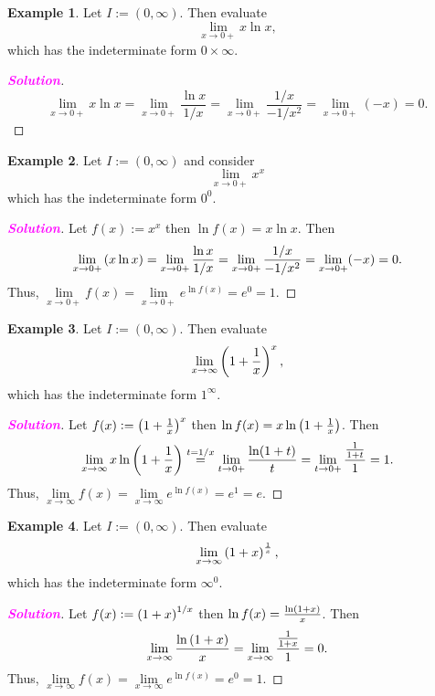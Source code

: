 \documentclass[12pt,openany]{book}
\theoremstyle{definition}
\newtheorem{example}{Example}[chapter]
\newcommand{\sol}{\textcolor{magenta}{\bf Solution}}
\begin{document}
	\begin{example}
		Let $I:=(0,\infty)$. Then evaluate \[
		\lim\limits_{x\to 0+}x\ln x,
		\] which has the indeterminate form $0\times\infty$.
		\begin{proof}[\sol]
			\[
			\lim\limits_{x\to 0+}x\ln x=\lim\limits_{x\to 0+}\frac{\ln x}{1/x}=\lim\limits_{x\to 0+}\frac{1/x}{-1/x^2}=\lim\limits_{x\to 0+}(-x)=0.
			\]
		\end{proof}
	\end{example}
	\vspace{15pt}
	\newpage
	\begin{example}
		Let $I:=(0,\infty)$ and consider \[
		\lim\limits_{x\to 0+}x^x
		\] which has the indeterminate form $0^0$.
		\begin{proof}[\sol]
			Let $f(x):=x^x$ then $\ln f(x)=x\ln x$. Then \[
			\lim\limits_{x\to 0+}\del{x\ln x}=\lim\limits_{x\to 0+}\frac{\ln x}{1/x}=\lim\limits_{x\to 0+}\frac{1/x}{-1/x^2}=\lim\limits_{x\to 0+}(-x)=0.
			\] Thus, $\lim\limits_{x\to 0+}f(x)=\lim\limits_{x\to 0+}e^{\ln f(x)}=e^0=1$.
		\end{proof}
	\end{example}
	\vspace{20pt}
	\begin{example}
		Let $I:=(0,\infty)$. Then evaluate \[
		\lim\limits_{x\to \infty}\del{1+\frac{1}{x}}^x,
		\] which has the indeterminate form $1^\infty$.
		\begin{proof}[\sol]
			Let $f(x):=\del{1+\frac{1}{x}}^x$ then $\ln f(x)=x\ln\del{1+\frac{1}{x}}$. Then \[
			\lim\limits_{x\to\infty}x\ln\del{1+\frac{1}{x}}\overset{t=1/x}{=}\lim\limits_{t\to 0+}\frac{\ln(1+t)}{t}=\lim\limits_{t\to 0+}\frac{\frac{1}{1+t}}{1}=1.
			\] Thus, $\lim\limits_{x\to\infty}f(x)=\lim\limits_{x\to\infty}e^{\ln f(x)}=e^1=e$.
		\end{proof}
	\end{example}
	\vspace{20pt}
	\begin{example}
		Let $I:=(0,\infty)$. Then evaluate \[
		\lim\limits_{x\to \infty}\del{1+x}^{\frac{1}{x}},
		\] which has the indeterminate form $\infty^0$.
		\begin{proof}[\sol]
			Let $f(x):=\del{1+x}^{1/x}$ then $\ln f(x)=\frac{\ln\del{1+x}}{x}$. Then \[
			\lim\limits_{x\to\infty}\frac{\ln\del{1+x}}{x}=\lim\limits_{x\to\infty}\frac{\frac{1}{1+x}}{1}=0.
			\] Thus, $\lim\limits_{x\to\infty}f(x)=\lim\limits_{x\to\infty}e^{\ln f(x)}=e^0=1$.
		\end{proof}
	\end{example}
	\newpage
\end{document}
